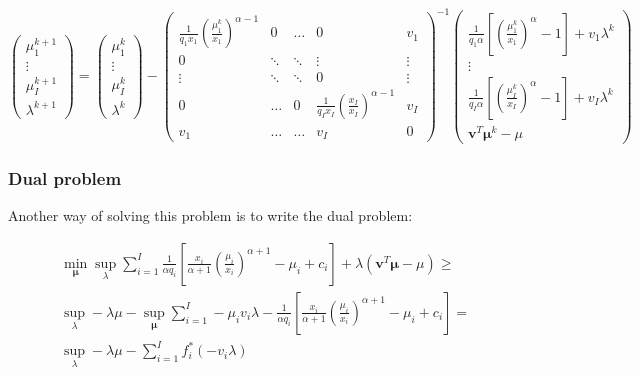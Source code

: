 \documentclass{tex/note}
\begin{document}
\begin{equation*}
\begin{pmatrix} \mu_1^{k + 1} \\ \vdots \\ \mu_I^{k + 1} \\ \lambda^{k + 1} \end{pmatrix} = \begin{pmatrix} \mu_1^k \\ \vdots \\ \mu_I^k \\ \lambda^k \end{pmatrix} - \begin{pmatrix} \frac{1}{q_1 x_1} \left( \frac{\mu_1^k}{x_1} \right)^{\alpha - 1} & 0 & \hdots & 0 & v_1 \\ 0 & \ddots & \ddots & \vdots & \vdots \\ \vdots & \ddots & \ddots & 0 & \vdots \\ 0 & \hdots & 0 & \frac{1}{q_I x_I} \left( \frac{x_I}{x_I} \right)^{\alpha - 1} & v_I \\ v_1 & \hdots & \hdots & v_I & 0 \end{pmatrix} ^{-1} \begin{pmatrix} \frac{1}{q_1 \alpha} \left[ \left( \frac{\mu_1^k}{x_1} \right)^{\alpha} - 1 \right] + v_1 \lambda^k \\ \vdots \\ \frac{1}{q_I \alpha} \left[ \left( \frac{\mu_I^k}{x_I} \right)^{\alpha} - 1 \right] + v_I \lambda^k \\ \bm{v}^T \bm{\mu}^k - \mu \end{pmatrix}
\end{equation*}

\subsubsection{Dual problem}

Another way of solving this problem is to write the dual problem:

\begin{align*}
& \min_{\bm{\mu}} \sup_{\lambda} \sum_{i = 1}^I \frac{1}{\alpha q_i} \left[ \frac{x_i}{\alpha + 1} \left( \frac{\mu_i}{x_i} \right) ^{\alpha + 1} - \mu_i + c_i \right] + \lambda \left( \bm{v}^T \bm{\mu} - \mu \right) \geq \\
& \sup_{\lambda} - \lambda \mu - \sup_{\bm{\mu}} \sum_{i = 1}^I - \mu_i v_i \lambda - \frac{1}{\alpha q_i} \left[ \frac{x_i}{\alpha + 1} \left( \frac{\mu_i}{x_i} \right) ^{\alpha + 1} - \mu_i + c_i \right] = \\
& \sup_{\lambda} - \lambda \mu - \sum_{i = 1}^I f_i^* \left( - v_i \lambda \right)
\end{align*}
\end{document}
